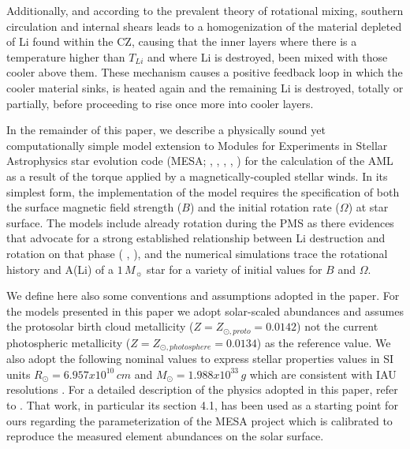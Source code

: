 \documentclass[fleqn,usenatbib]{mnras}
\begin{document}
Additionally, and according to the prevalent theory of rotational mixing, southern circulation and internal shears leads to a homogenization of the material depleted of Li found within the CZ, causing that the inner layers where there is a temperature higher than $T_{Li}$ and where Li is destroyed, been mixed with those cooler above them. These mechanism causes a positive feedback loop in which the cooler material sinks, is heated again and the remaining Li is destroyed, totally or partially, before proceeding to rise once more into cooler layers. \par

In the remainder of this paper, we describe a physically sound yet computationally simple model extension to Modules for Experiments in Stellar Astrophysics star evolution code (MESA; \citeauthor{Paxton2011} \citeyear{Paxton2011}, \citeyear{Paxton2013}, \citeyear{Paxton2015}, \citeyear{Paxton2018}, \citeyear{Paxton2019}) for the calculation of the AML as a result of the torque applied by a magnetically-coupled stellar winds. In its simplest form, the implementation of the model requires the specification of both the surface magnetic field strength ($B$) and the initial rotation rate ($\Omega$) at star surface. The models include already rotation during the PMS as there evidences that advocate for a strong established relationship between Li destruction and rotation on that phase (\citeauthor{Bouvier2016} \citeyear{Bouvier2016}, \citeyear{Bouvier2018}), and the numerical simulations trace the rotational history and A(Li) of a $1\, M_{\sun}$ star for a variety of initial values for $B$ and $\Omega$.\par

We define here also some conventions and assumptions adopted in the paper. For the models presented in this paper we adopt solar-scaled abundances and assumes the \citet{Asplund2009} protosolar birth cloud metallicity ($Z = Z_{\odot, proto} = 0.0142$) not the current photospheric metallicity ($Z = Z_{\odot, photosphere} = 0.0134$) as the reference value. We also adopt the following nominal values to express stellar properties values in SI units $R_{\odot} = 6.957x10^{10}\, cm$ and $M_{\odot} = 1.988x10^{33}\, g$ which are consistent with IAU resolutions \citep{Mamajek2015}. For a detailed description of the physics adopted in this paper, refer to \citet{Choi2016}. That work, in particular its section 4.1, has been used as a starting point for ours regarding the parameterization of the MESA project which is calibrated to reproduce the measured element abundances on the solar surface.\par
\end{document}
